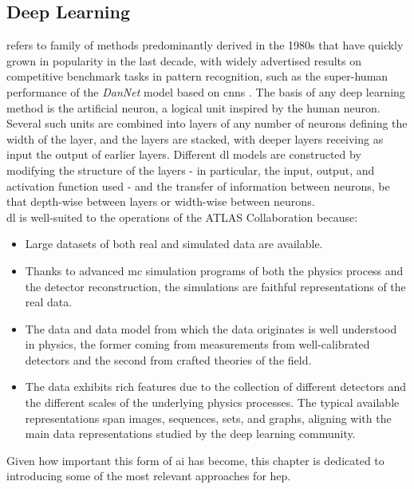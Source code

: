 \subsection{Deep Learning} 
 refers to family of methods predominantly derived in the 1980s that have quickly grown in popularity in the last decade, with widely advertised results on competitive benchmark tasks in pattern recognition, such as the super-human performance of the \textit{DanNet} model \cite{DanNet} based on \glspl{cnn} \cite{NIPS198953c3bce6}. The basis of any deep learning method is the artificial neuron, a logical unit inspired by the human neuron. Several such units are combined into layers of any number of neurons defining the width of the layer, and the layers are stacked, with deeper layers receiving as input the output of earlier layers. Different \gls{dl} models are constructed by modifying the structure of the layers - in particular, the input, output, and activation function used - and the transfer of information between neurons, be that depth-wise between layers or width-wise between neurons. \\

\gls{dl} is well-suited to the operations of the ATLAS Collaboration because:
\begin{itemize}
    \item Large datasets of both real and simulated data are available.
    \item Thanks to advanced \gls{mc} simulation programs of both the physics process and the detector reconstruction, the simulations are faithful representations of the real data.
    \item The data and data model from which the data originates is well understood in physics, the former coming from measurements from well-calibrated detectors and the second from crafted theories of the field. 
    \item The data exhibits rich features due to the collection of different detectors and the different scales of the underlying physics processes. The typical available representations span images, sequences, sets, and graphs, aligning with the main data representations studied by the deep learning community.
\end{itemize}
Given how important this form of \gls{ai} has become, this chapter is dedicated to introducing some of the most relevant approaches for \gls{hep}. 

